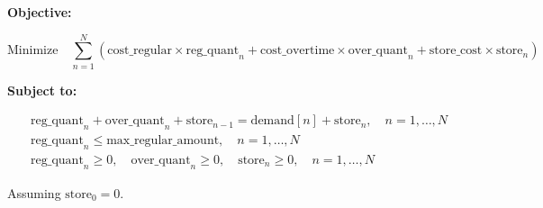 \documentclass{article}
\begin{document}
\textbf{Objective:}

\[
\text{Minimize} \quad \sum_{n=1}^{N} \left( \text{cost\_regular} \times \text{reg\_quant}_n + \text{cost\_overtime} \times \text{over\_quant}_n + \text{store\_cost} \times \text{store}_n \right)
\]

\textbf{Subject to:}

\begin{align*}
& \text{reg\_quant}_n + \text{over\_quant}_n + \text{store}_{n-1} = \text{demand}[n] + \text{store}_n, \quad n = 1, \ldots, N \\
& \text{reg\_quant}_n \leq \text{max\_regular\_amount}, \quad n = 1, \ldots, N \\
& \text{reg\_quant}_n \geq 0, \quad \text{over\_quant}_n \geq 0, \quad \text{store}_n \geq 0, \quad n = 1, \ldots, N
\end{align*}

Assuming \(\text{store}_0 = 0\).
\end{document}
